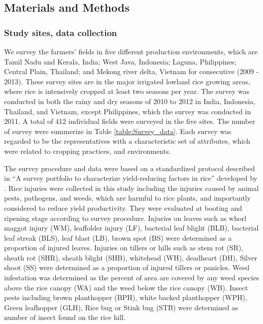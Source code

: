\subsection{Materials and Methods}

\subsubsection{Study sites, data collection}

We survey the farmers' fields in five different production environments, which are Tamil Nadu  and Kerala, India; West Java, Indonesia; Laguna, Philippines; Central Plain, Thailand; and Mekong river delta, Vietnam for consecutive (2009 - 2013). These survey sites are in the major irrigated lowland rice growing areas, where rice is intensively cropped at least two seasons per year. The survey was conducted in both the rainy and dry seasons of 2010 to 2012 in India, Indonesia, Thailand, and Vietnam, except Philippines, which the survey was conducted in 2011. A total of 412 individual fields were surveyed in the five sites. The number of survey were summerize in Table \ref{table:Survey_data}. Each survey was regarded to be the representatives with a characteristic set of attributes, which were related to cropping practices, and environments.


The survey procedure and data were based on a standardized protocol described in ``A survey portfolio to characterize yield-reducing factors in rice'' developed by \citet{Savary_2009_Survey}. Rice injuries were collected in this study including the injuries caused by animal pests, pathogens, and weeds, which are harmful to rice plants, and importantly considered to reduce yield productivity. They were evaluated at booting and ripening stage according to survey procedure. Injuries on leaves such as whorl maggot injury (WM), leaffolder injury (LF), bacterial leaf blight (BLB), bacterial leaf streak (BLS), leaf blast (LB), brown spot (BS) were determined as a proportion of injured leaves. Injuries on tillers or hills such as stem rot (SR), sheath rot (SHR), sheath blight (SHB), whitehead (WH), deadheart (DH), Silver shoot (SS) were determined as a proportion of injured tillers or panicles. Weed infestation was determined as the percent of area are covered by any weed species above the rice canopy (WA) and the weed below the rice canopy (WB). Insect pests including brown planthopper (BPH), white backed planthopper (WPH), Green leafhopper (GLH), Rice bug or Stink bug (STB) were determined as number of insect found on the rice hill. 

